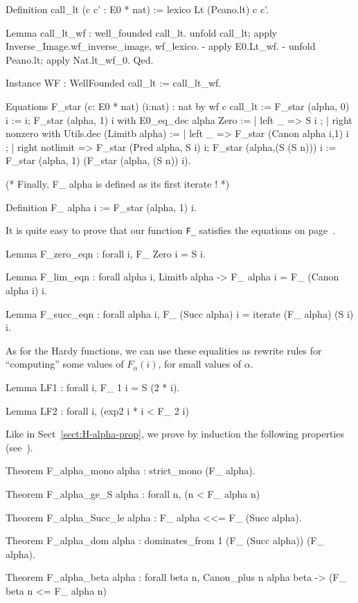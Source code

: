 \begin{Coqsrc}
Definition call_lt (c c' : E0 * nat) :=
  lexico Lt (Peano.lt) c c'.

Lemma call_lt_wf : well_founded call_lt.
  unfold call_lt; apply Inverse_Image.wf_inverse_image,  wf_lexico.
  -  apply E0.Lt_wf.
  -  unfold Peano.lt; apply Nat.lt_wf_0. 
Qed.

Instance WF : WellFounded call_lt := call_lt_wf.

Equations  F_star (c: E0 * nat) (i:nat) :  nat by wf  c call_lt :=
    F_star (alpha, 0) i := i;
    F_star (alpha, 1) i
      with E0_eq_dec alpha Zero :=
           { | left _ => S i ;
             | right nonzero
                 with Utils.dec (Limitb alpha) :=
                 { | left _ => F_star (Canon alpha i,1) i ;
                   | right notlimit =>
                     F_star (Pred alpha, S i)  i}};
    F_star (alpha,(S (S n))) i :=
               F_star (alpha, 1) (F_star (alpha, (S n)) i).

(* Finally, F_ alpha is defined as its first iterate ! *)

Definition F_  alpha i := F_star (alpha, 1) i.
\end{Coqsrc}

It is quite easy to prove that our function \texttt{F\_} satisfies the equations on page~\pageref{sect:F-equations}.

\begin{Coqsrc}
Lemma F_zero_eqn : forall i, F_ Zero i = S i.

Lemma F_lim_eqn : forall alpha i,  Limitb alpha ->
                               F_ alpha i = F_ (Canon alpha i) i.

Lemma F_succ_eqn : forall alpha i,
    F_ (Succ alpha) i = iterate (F_ alpha) (S i) i.
\end{Coqsrc}

As for the Hardy functions, we can use these equalities as rewrite rules for
``computing'' some values of $F_\alpha(i)$, for small values of $\alpha$.

\begin{Coqsrc}
Lemma LF1 : forall i,  F_ 1 i = S (2 * i).

Lemma LF2 : forall i, (exp2 i * i < F_ 2 i)%
\end{Coqsrc}


Like in Sect~\ref{sect:H-alpha-prop}, we prove by induction the following properties (see~\cite{KS81}). 

\begin{Coqsrc}
Theorem F_alpha_mono alpha : strict_mono (F_ alpha).
 
Theorem F_alpha_ge_S alpha : forall n, (n < F_ alpha n)%

Theorem F_alpha_Succ_le alpha : F_ alpha <<= F_ (Succ alpha).

Theorem F_alpha_dom alpha : dominates_from 1 (F_ (Succ alpha)) (F_ alpha).

Theorem F_alpha_beta alpha : forall beta n, Canon_plus n alpha beta -> 
                                        (F_ beta n <= F_ alpha n)%
\end{Coqsrc}

